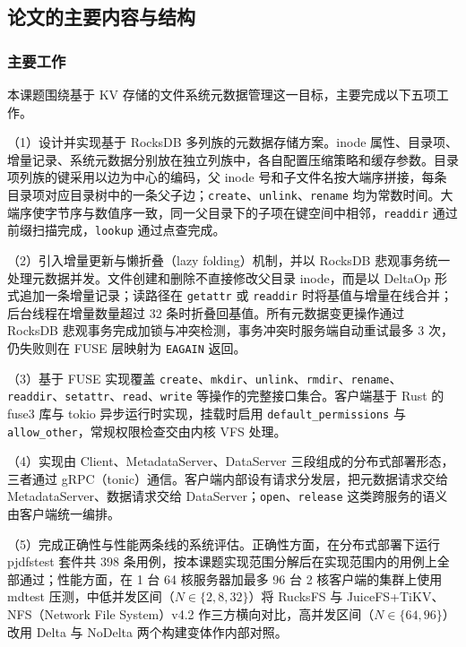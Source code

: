 \subsection{论文的主要内容与结构}

\subsubsection{主要工作}

本课题围绕基于 KV 存储的文件系统元数据管理这一目标，主要完成以下五项工作。

（1）设计并实现基于 RocksDB 多列族的元数据存储方案。inode 属性、目录项、增量记录、系统元数据分别放在独立列族中，各自配置压缩策略和缓存参数。目录项列族的键采用以边为中心的编码，父 inode 号和子文件名按大端序拼接，每条目录项对应目录树中的一条父子边；\texttt{create}、\texttt{unlink}、\texttt{rename} 均为常数时间。大端序使字节序与数值序一致，同一父目录下的子项在键空间中相邻，\texttt{readdir} 通过前缀扫描完成，\texttt{lookup} 通过点查完成。

（2）引入增量更新与懒折叠（lazy folding）机制，并以 RocksDB 悲观事务统一处理元数据并发。文件创建和删除不直接修改父目录 inode，而是以 DeltaOp 形式追加一条增量记录；读路径在 \texttt{getattr} 或 \texttt{readdir} 时将基值与增量在线合并；后台线程在增量数量超过 32 条时折叠回基值。所有元数据变更操作通过 RocksDB 悲观事务完成加锁与冲突检测，事务冲突时服务端自动重试最多 3 次，仍失败则在 FUSE 层映射为 \texttt{EAGAIN} 返回。

（3）基于 FUSE 实现覆盖 \texttt{create}、\texttt{mkdir}、\texttt{unlink}、\texttt{rmdir}、\texttt{rename}、\texttt{readdir}、\texttt{setattr}、\texttt{read}、\texttt{write} 等操作的完整接口集合。客户端基于 Rust 的 fuse3 库与 tokio 异步运行时实现，挂载时启用 \texttt{default\_permissions} 与 \texttt{allow\_other}，常规权限检查交由内核 VFS 处理。

（4）实现由 Client、MetadataServer、DataServer 三段组成的分布式部署形态，三者通过 gRPC（tonic）通信。客户端内部设有请求分发层，把元数据请求交给 MetadataServer、数据请求交给 DataServer；\texttt{open}、\texttt{release} 这类跨服务的语义由客户端统一编排。

（5）完成正确性与性能两条线的系统评估。正确性方面，在分布式部署下运行 pjdfstest 套件共 398 条用例，按本课题实现范围分解后在实现范围内的用例上全部通过；性能方面，在 1 台 64 核服务器加最多 96 台 2 核客户端的集群上使用 mdtest 压测，中低并发区间（$N \in \{2, 8, 32\}$）将 RucksFS 与 JuiceFS+TiKV、NFS（Network File System）v4.2 作三方横向对比，高并发区间（$N \in \{64, 96\}$）改用 Delta 与 NoDelta 两个构建变体作内部对照。

